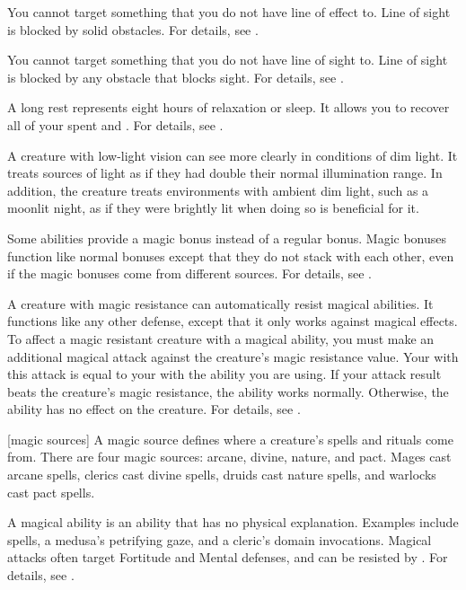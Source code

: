  You cannot target something that you do not have line of effect to.
Line of sight is blocked by solid obstacles.
For details, see .

 You cannot target something that you do not have line of sight to.
Line of sight is blocked by any obstacle that blocks sight.
For details, see .

 A long rest represents eight hours of relaxation or sleep.
It allows you to recover all of your spent  and .
For details, see .

 A creature with low-light vision can see more clearly in conditions of dim light.
It treats sources of light as if they had double their normal illumination range.
In addition, the creature treats environments with ambient dim light, such as a moonlit night, as if they were brightly lit when doing so is beneficial for it.

 Some abilities provide a magic bonus instead of a regular bonus.
Magic bonuses function like normal bonuses except that they do not stack with each other, even if the magic bonuses come from different sources.
For details, see .

 A creature with magic resistance can automatically resist magical abilities.
It functions like any other defense, except that it only works against magical effects.
To affect a magic resistant creature with a magical ability, you must make an additional magical attack against the creature's magic resistance value.
Your  with this attack is equal to your  with the ability you are using.
If your attack result beats the creature's magic resistance, the ability works normally.
Otherwise, the ability has no effect on the creature.
For details, see .

[magic sources] A magic source defines where a creature's spells and rituals come from.
There are four magic sources: arcane, divine, nature, and pact.
Mages cast arcane spells, clerics cast divine spells, druids cast nature spells, and warlocks cast pact spells.

 A magical ability is an ability that has no physical explanation.
Examples include spells, a medusa's petrifying gaze, and a cleric's domain invocations.
Magical attacks often target Fortitude and Mental defenses, and can be resisted by .
For details, see .

